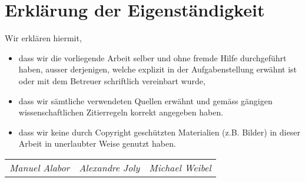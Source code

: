 \chapter*{Erklärung der Eigenständigkeit}

Wir erklären hiermit,

\begin{itemize}
	\item dass wir die vorliegende Arbeit selber und ohne fremde Hilfe durchgeführt haben, ausser derjenigen, welche explizit in der Aufgabenstellung erwähnt ist oder mit dem Betreuer schriftlich vereinbart wurde,
	\item dass wir sämtliche verwendeten Quellen erwähnt und gemäss gängigen wissenschaftlichen Zitierregeln korrekt angegeben haben.
	\item dass wir keine durch Copyright geschützten Materialien (z.B. Bilder) in dieser Arbeit in unerlaubter Weise genutzt haben.
\end{itemize}


\vspace*{5cm}

\begin{table}[H]
\begin{tabularx}{\textwidth}{X X X}
	\sffamily\textit{Manuel Alabor} &
	\centering\sffamily\textit{Alexandre Joly} &
	\hfill\sffamily\textit{Michael Weibel}
	\tabularnewline
\end{tabularx}
\end{table}
